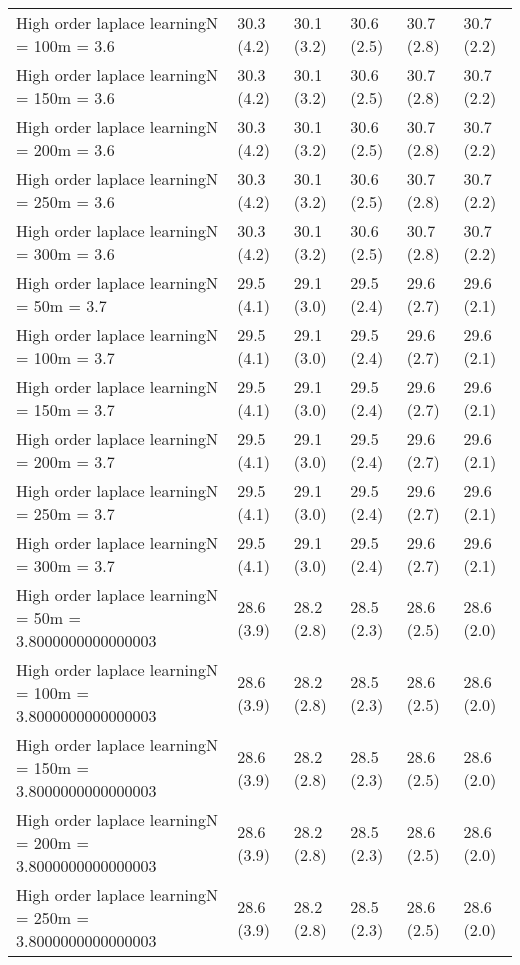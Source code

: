 \documentclass{article}
\begin{document}
\begin{table*}[t!]
\begin{center}
\begin{small}
\begin{sc}
\begin{tabular}{llllll}
High order laplace learningN = 100m = 3.6&30.3 (4.2)      &30.1 (3.2)      &30.6 (2.5)      &30.7 (2.8)      &30.7 (2.2)      \\
High order laplace learningN = 150m = 3.6&30.3 (4.2)      &30.1 (3.2)      &30.6 (2.5)      &30.7 (2.8)      &30.7 (2.2)      \\
High order laplace learningN = 200m = 3.6&30.3 (4.2)      &30.1 (3.2)      &30.6 (2.5)      &30.7 (2.8)      &30.7 (2.2)      \\
High order laplace learningN = 250m = 3.6&30.3 (4.2)      &30.1 (3.2)      &30.6 (2.5)      &30.7 (2.8)      &30.7 (2.2)      \\
High order laplace learningN = 300m = 3.6&30.3 (4.2)      &30.1 (3.2)      &30.6 (2.5)      &30.7 (2.8)      &30.7 (2.2)      \\
High order laplace learningN = 50m = 3.7&29.5 (4.1)      &29.1 (3.0)      &29.5 (2.4)      &29.6 (2.7)      &29.6 (2.1)      \\
High order laplace learningN = 100m = 3.7&29.5 (4.1)      &29.1 (3.0)      &29.5 (2.4)      &29.6 (2.7)      &29.6 (2.1)      \\
High order laplace learningN = 150m = 3.7&29.5 (4.1)      &29.1 (3.0)      &29.5 (2.4)      &29.6 (2.7)      &29.6 (2.1)      \\
High order laplace learningN = 200m = 3.7&29.5 (4.1)      &29.1 (3.0)      &29.5 (2.4)      &29.6 (2.7)      &29.6 (2.1)      \\
High order laplace learningN = 250m = 3.7&29.5 (4.1)      &29.1 (3.0)      &29.5 (2.4)      &29.6 (2.7)      &29.6 (2.1)      \\
High order laplace learningN = 300m = 3.7&29.5 (4.1)      &29.1 (3.0)      &29.5 (2.4)      &29.6 (2.7)      &29.6 (2.1)      \\
High order laplace learningN = 50m = 3.8000000000000003&28.6 (3.9)      &28.2 (2.8)      &28.5 (2.3)      &28.6 (2.5)      &28.6 (2.0)      \\
High order laplace learningN = 100m = 3.8000000000000003&28.6 (3.9)      &28.2 (2.8)      &28.5 (2.3)      &28.6 (2.5)      &28.6 (2.0)      \\
High order laplace learningN = 150m = 3.8000000000000003&28.6 (3.9)      &28.2 (2.8)      &28.5 (2.3)      &28.6 (2.5)      &28.6 (2.0)      \\
High order laplace learningN = 200m = 3.8000000000000003&28.6 (3.9)      &28.2 (2.8)      &28.5 (2.3)      &28.6 (2.5)      &28.6 (2.0)      \\
High order laplace learningN = 250m = 3.8000000000000003&28.6 (3.9)      &28.2 (2.8)      &28.5 (2.3)      &28.6 (2.5)      &28.6 (2.0)      \\

\end{tabular}
\end{sc}
\end{small}
\end{center}
\end{table*}
\end{document}
